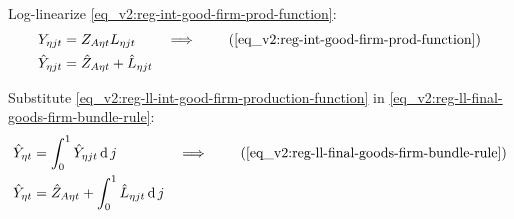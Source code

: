 \documentclass[../thesis.tex]{subfiles}
\begin{document}
\begin{comment}
	Log-linearize \ref{eq_v2:reg-int-good-firm-prod-function}:
	\begin{alignat}{2}
		Y_{\eta jt} &= Z_{A\eta t} K_{\eta jt}^{\alpha_{\eta}} L_{\eta jt}^{1-\alpha_{\eta}} &\implies \tag{\ref{eq_v2:reg-int-good-firm-prod-function}} \\
		Y_{\eta j} (1+ \hat{Y}_{\eta jt}) &= Z_{A\eta} K_{\eta j}^{\alpha_{\eta}} L_{\eta j}^{1-\alpha_{\eta}} (1+ \hat{Z}_{A\eta t} + {\alpha_{\eta}} \hat{K}_{\eta jt} + (1-\alpha_{\eta}) \hat{L}_{\eta jt}) &\implies \nonumber \\
		\hat{Y}_{\eta jt} &= \hat{Z}_{A\eta t} + {\alpha_{\eta}} \hat{K}_{\eta jt} + (1-\alpha_{\eta}) \hat{L}_{\eta jt} %
	\end{alignat}
	
	Substitute \ref{eq_v2:reg-ll-int-good-firm-production-function} in \ref{eq_v2:reg-ll-final-goods-firm-bundle-rule}:
	\begin{alignat}{2}
		\hat{Y}_{\eta t} &= \int_{0}^{1} \hat{Y}_{\eta jt} \dif j &\implies \tag{\ref{eq_v2:reg-ll-final-goods-firm-bundle-rule}} \\
		\hat{Y}_{\eta t} &= \int_{0}^{1} \left[ \hat{Z}_{A\eta t} + {\alpha_{\eta}} \hat{K}_{\eta jt} + (1-\alpha_{\eta}) \hat{L}_{\eta jt} \right] \dif j &\implies \nonumber \\
		\hat{Y}_{\eta t} &= \hat{Z}_{A\eta t} + {\alpha_{\eta}} \int_{0}^{1} \hat{K}_{\eta jt} \dif j + (1-\alpha_{\eta}) \int_{0}^{1} \hat{L}_{\eta jt} \dif j %
	\end{alignat}
\end{comment}

Log-linearize \ref{eq_v2:reg-int-good-firm-prod-function}:
\begin{alignat}{2}
	Y_{\eta jt} &= Z_{A\eta t} L_{\eta jt} &\implies \tag{\ref{eq_v2:reg-int-good-firm-prod-function}} \\
	\hat{Y}_{\eta jt} &= \hat{Z}_{A\eta t} + \hat{L}_{\eta jt} \label{eq_v2:reg-ll-int-good-firm-production-function}
\end{alignat}

Substitute \ref{eq_v2:reg-ll-int-good-firm-production-function} in \ref{eq_v2:reg-ll-final-goods-firm-bundle-rule}:
\begin{alignat}{2}
	\hat{Y}_{\eta t} &= \int_{0}^{1} \hat{Y}_{\eta jt} \dif j &\implies \tag{\ref{eq_v2:reg-ll-final-goods-firm-bundle-rule}} \\
	\hat{Y}_{\eta t} &= \hat{Z}_{A\eta t} + \int_{0}^{1} \hat{L}_{\eta jt} \dif j \label{eq_v2:reg-ll-final-goods-firm-bundle-rule-2}
\end{alignat}
\end{document}
